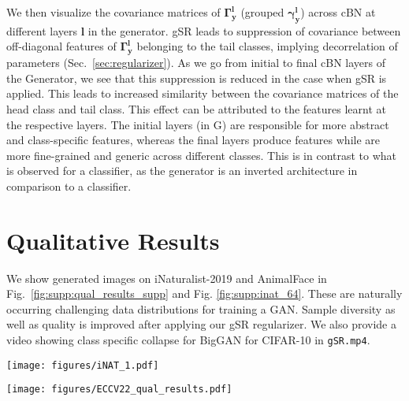 \documentclass[runningheads,table]{llncs}
\begin{document}
We then visualize the covariance matrices of $\mathbf{\Gamma^l_y}$ (grouped $\mathbf{\gamma^l_y}$) across cBN at different layers $\mathbf{l}$ in the generator. gSR leads to suppression of covariance between off-diagonal features of $\mathbf{\Gamma^l_y}$ belonging to the tail classes, implying decorrelation of parameters (Sec.~\ref{sec:regularizer}). As we go from initial to final cBN layers of the Generator, we see that this suppression is reduced in the case when gSR is applied. This leads to increased similarity between the covariance matrices of the head class and tail class. This effect can be attributed to the features learnt at the respective layers. The initial layers (in G) are responsible for more abstract and class-specific features, whereas the final layers produce features while are more fine-grained and generic across different classes. This is in contrast to what is observed for a classifier, as the generator is an inverted architecture in comparison to a classifier.

\section{Qualitative Results}
\label{sec:supp:qual}
We show generated images on iNaturalist-2019 and AnimalFace in Fig.~\ref{fig:supp:qual_results_supp} and Fig. \ref{fig:supp:inat_64}. These are naturally occurring challenging data distributions for training a GAN. Sample diversity as well as quality is improved after applying our gSR regularizer. We also provide a video showing class specific collapse for BigGAN for CIFAR-10 in \texttt{gSR.mp4}.

\begin{figure*}[t]    
    \centering
    \texttt{[image: figures/iNAT\_1.pdf]}
    \caption{\textbf{Qualitative comparison of BigGAN variants on Tail classes from iNaturalist 2019 dataset ($\rho$=100) (64 $\times$ 64).} Each row represents images from a distinct class. }
    \label{fig:supp:inat_64}
    \vspace{-3mm}
\end{figure*}



\begin{figure*}[!t]
    \centering
    \texttt{[image: figures/ECCV22\_qual\_results.pdf]}
    \caption{\textbf{Qualitative Results.} The baseline is composed of BigGAN~\cite{brock2018large}+LeCam~\cite{tseng2021regularizing}+DiffAug~\cite{zhao2020differentiable}. gSR improves the quality and diversity of the images generated by baseline over challenging iNaturalist-19 and AnimalFace datasets.}
    \label{fig:supp:qual_results_supp}
\end{figure*}
\end{document}
